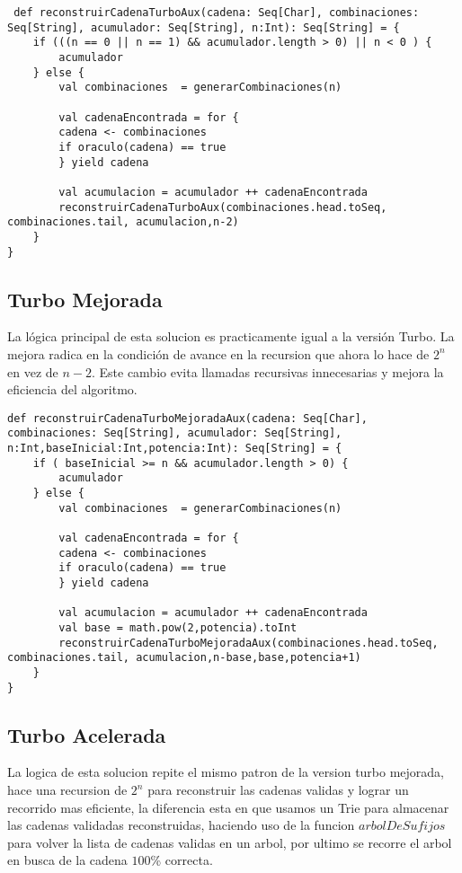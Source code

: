 \documentclass[conference]{IEEEtran}
\begin{document}
\begin{lstlisting}
 def reconstruirCadenaTurboAux(cadena: Seq[Char], combinaciones: Seq[String], acumulador: Seq[String], n:Int): Seq[String] = {
    if (((n == 0 || n == 1) && acumulador.length > 0) || n < 0 ) {
        acumulador
    } else {
        val combinaciones  = generarCombinaciones(n)
                
        val cadenaEncontrada = for {
        cadena <- combinaciones
        if oraculo(cadena) == true
        } yield cadena
            
        val acumulacion = acumulador ++ cadenaEncontrada
        reconstruirCadenaTurboAux(combinaciones.head.toSeq, combinaciones.tail, acumulacion,n-2)
    }
}
\end{lstlisting}

\newpage
\subsection{\textbf{Turbo Mejorada}}
La lógica principal de esta solucion es practicamente igual a la versión Turbo. La mejora radica en la condición de avance en la recursion que ahora lo hace de $2^n$ en vez de $n-2$. Este cambio evita llamadas recursivas innecesarias y mejora la eficiencia del algoritmo.

\begin{lstlisting}
def reconstruirCadenaTurboMejoradaAux(cadena: Seq[Char], combinaciones: Seq[String], acumulador: Seq[String], n:Int,baseInicial:Int,potencia:Int): Seq[String] = {
    if ( baseInicial >= n && acumulador.length > 0) {
        acumulador
    } else {
        val combinaciones  = generarCombinaciones(n)
                
        val cadenaEncontrada = for {
        cadena <- combinaciones
        if oraculo(cadena) == true
        } yield cadena
            
        val acumulacion = acumulador ++ cadenaEncontrada
        val base = math.pow(2,potencia).toInt
        reconstruirCadenaTurboMejoradaAux(combinaciones.head.toSeq, combinaciones.tail, acumulacion,n-base,base,potencia+1)
    }
}

\end{lstlisting}

\subsection{\textbf{Turbo Acelerada}}

La logica de esta solucion repite el mismo patron de la version turbo mejorada, hace una recursion de $2^n$ para reconstruir las cadenas validas y lograr un recorrido mas eficiente, la diferencia esta en que usamos un Trie para almacenar las cadenas validadas reconstruidas, haciendo uso de la funcion $arbolDeSufijos$ para volver la lista de cadenas validas en un arbol, por ultimo se recorre el arbol en busca de la cadena $100$\% correcta.
\end{document}

